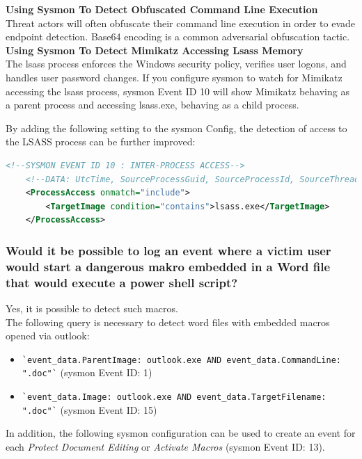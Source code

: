 \textbf{Using Sysmon To Detect Obfuscated Command Line Execution}\\
Threat actors will often obfuscate their command line execution in order to evade endpoint detection. Base64 encoding is a common adversarial obfuscation tactic.\\

\textbf{Using Sysmon To Detect Mimikatz Accessing Lsass Memory}\\
The lsass process enforces the Windows security policy, verifies user logons, and handles user password changes. If you configure sysmon to watch for Mimikatz accessing the lsass process, sysmon Event ID 10 will show Mimikatz behaving as a parent process and accessing lsass.exe, behaving as a child process.

By adding the following setting to the sysmon Config, the detection of access to the LSASS process can be further improved:

\begin{lstlisting}[language=XML]
    <!--SYSMON EVENT ID 10 : INTER-PROCESS ACCESS-->
    <!--DATA: UtcTime, SourceProcessGuid, SourceProcessId, SourceThreadId, SourceImage, TargetProcessGuid, TargetProcessId, TargetImage, GrantedAccess, CallTrace-->
    <ProcessAccess onmatch="include">
        <TargetImage condition="contains">lsass.exe</TargetImage>
    </ProcessAccess>
\end{lstlisting}

\subsubsection{Would it be possible to log an event where a victim user would start a dangerous makro embedded in a Word file that would execute a power shell script?}
Yes, it is possible to detect such macros.\\
The following query is necessary to detect word files with embedded macros opened via outlook:\\
\begin{itemize}
    \item \lstinline|`event_data.ParentImage: outlook.exe AND event_data.CommandLine: ".doc"`| (sysmon Event ID: 1)
    \item \lstinline|`event_data.Image: outlook.exe AND event_data.TargetFilename: ".doc"`| (sysmon Event ID: 15)\\
\end{itemize}

In addition, the following sysmon configuration can be used to create an event for each \textit{Protect Document Editing} or \textit{Activate Macros} (sysmon Event ID: 13).


